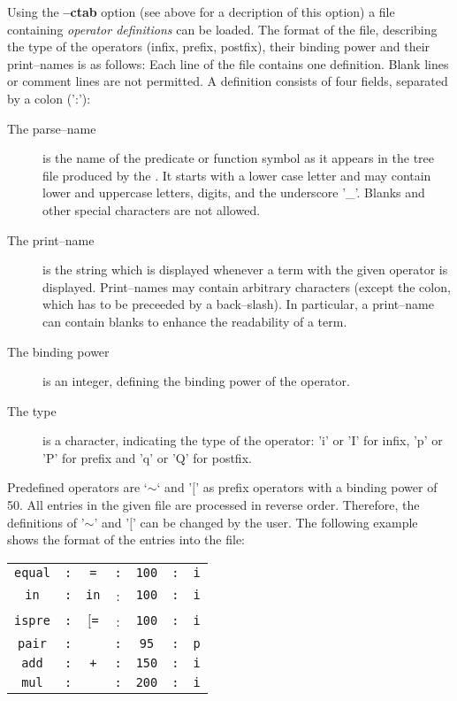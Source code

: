 Using the {\bf --ctab} option (see above for a decription of this
option) a file containing {\it operator definitions\/} can be loaded.
The format of the file, describing the type of the operators
(infix,  prefix,  postfix),  their  binding  power and their
print--names is as follows: Each line of  the  file  contains
one definition. Blank lines or comment lines are not permitted. 
A definition consists of four fields,  separated  by  a colon (':'):
\begin{description}
      \item[The parse--name]
           {is the name of the predicate or function symbol  as  it
            appears  in  the  tree file produced by the \SAM.  It
            starts with a lower case letter and may  contain  lower
            and  uppercase letters, digits, and the underscore '\_'.
            Blanks and other special characters are not allowed.}
      \item[The print--name]
           {is the string which is displayed whenever a  term  with
            the  given  operator is displayed. Print--names may
            contain arbitrary characters (except the colon, which  has
            to  be  preceeded  by  a back--slash).  In particular, a
            print--name can contain blanks to enhance the  readability
            of a term.}
      \item[The binding power]
           {is an integer, defining the binding power of the operator.}
      \item[The type]
           {is a character, indicating the type  of  the  operator:
            'i'  or 'I' for infix, 'p' or 'P' for prefix and 'q' or
            'Q' for postfix.}
\end{description}

Predefined operators are `$\sim$` and '$[$' as prefix operators with a
binding power of 50. All entries in the given file are processed
in reverse order.  Therefore, the definitions of '$\sim$' and '$[$'
can be changed by the user.  The following example shows the
format of the entries into the file:
\begin{center}
\begin{tabular}{ccccccc}
{\tt equal} & {\tt :} & {\tt =}    & {\tt :} & {\tt 100} & {\tt :} & {\tt i} \\
{\tt in}    & {\tt :} & {\tt in}   & {\tt }: & {\tt 100} & {\tt :} & {\tt i} \\
{\tt ispre} & {\tt :} & {\tt $[$=} & {\tt }: & {\tt 100} & {\tt :} & {\tt i} \\
{\tt pair}  & {\tt :} &            & {\tt :} &  {\tt 95} & {\tt :} & {\tt p} \\
{\tt add}   & {\tt :} & {\tt +}    & {\tt :} & {\tt 150} & {\tt :} & {\tt i} \\
{\tt mul}   & {\tt :} & {\tt *}    & {\tt :} & {\tt 200} & {\tt :} & {\tt i}
\end{tabular}
\end{center}

